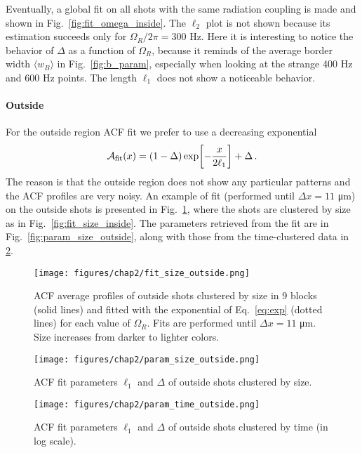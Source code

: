 Eventually, a global fit on all shots with the same radiation coupling is made and shown in Fig.\ \ref{fig:fit_omega_inside}. The $\ell_2$ plot is not shown because its estimation succeeds only for $\Omega_R/2\pi = 300$ \unit{\hertz}. Here it is interesting to notice the behavior of $\Delta$ as a function of $\Omega_R$, because it reminds of the average border width $\langle w_B \rangle$ in Fig.\ \ref{fig:b_param}, especially when looking at the strange 400 Hz and 600 Hz points. The length $\ell_1$ does not show a noticeable behavior.

\paragraph{Outside}
For the outside region ACF fit we prefer to use a decreasing exponential
\begin{equation}
    \mathcal{A}_{\rm fit}(x) = (1-\Delta)\exp[-\frac{x}{2\ell_1}] + \Delta\, .
    \label{eq:exp}
\end{equation}
The reason is that the outside region does not show any particular patterns and the ACF profiles are very noisy.
An example of fit (performed until $\Delta x = 11$ \unit{\micro\meter}) on the outside shots is presented in Fig.\ \ref{fig:fit_size_outside}, where the shots are clustered by size as in Fig.\ \ref{fig:fit_size_inside}. The parameters retrieved from the fit are in Fig.\ \ref{fig:param_size_outside}, along with those from the time-clustered data in \ref{fig:param_time_outside}. 
\begin{figure}[ht!]
    \centering
    \texttt{[image: figures/chap2/fit\_size\_outside.png]}
    \caption{ACF average profiles of outside shots clustered by size in 9 blocks (solid lines) and fitted with the exponential of Eq.\ \eqref{eq:exp} (dotted lines) for each value of $\Omega_R$. Fits are performed until $\Delta x = 11$ \unit{\micro\meter}. Size increases from darker to lighter colors.}
    \label{fig:fit_size_outside}
\end{figure}
\begin{figure}[ht!]
    \centering
    \begin{minipage}[t]{0.47 \textwidth}
        \centering
        \texttt{[image: figures/chap2/param\_size\_outside.png]}
        \caption{ACF fit parameters $\ell_1$ and $\Delta$ of outside shots clustered by size.}
        \label{fig:param_size_outside}
    \end{minipage}
    \hspace{0.02\textwidth}
    \begin{minipage}[t]{0.47 \textwidth}
        \centering
        \texttt{[image: figures/chap2/param\_time\_outside.png]}
        \caption{ACF fit parameters $\ell_1$ and $\Delta$ of outside shots clustered by time (in log scale).}
        \label{fig:param_time_outside}
    \end{minipage}
\end{figure}
